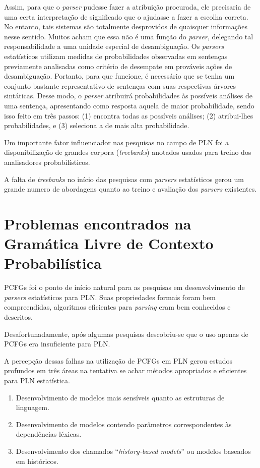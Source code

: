 Assim, para que o \emph{parser} pudesse fazer a atribuição procurada, ele precisaria de uma certa interpretação de significado que o ajudasse a fazer a escolha correta. No entanto, tais sistemas são totalmente desprovidos de quaisquer informações nesse sentido. Muitos acham que essa não é uma função do \emph{parser}, delegando tal responsabilidade a uma unidade especial de desambiguação.
Os \emph{parsers} estatísticos utilizam medidas de probabilidades observadas em sentenças previamente analisadas como critério de desempate em prováveis ações de desambiguação. Portanto, para que funcione, é necessário que se tenha um conjunto bastante representativo de sentenças com suas respectivas árvores sintáticas. Desse modo, o \emph{parser} atribuirá probabilidades às possíveis análises de uma sentença, apresentando como resposta aquela de maior probabilidade, sendo isso feito em três passos: (1) encontra todas as possíveis análises; (2) atribui-lhes probabilidades, e (3) seleciona a de mais alta probabilidade.


Um importante fator influenciador nas pesquisas no campo de PLN foi a disponibilização de grandes corpora (\emph{treebanks}) anotados usados para treino dos analisadores probabilísticos.

A falta de \emph{treebanks} no início das pesquisas com \emph{parsers} estatísticos gerou um grande numero de abordagens quanto ao treino e avaliação dos \emph{parsers} existentes.



\section{Problemas encontrados  na Gramática Livre de Contexto Probabilística}
\label{sec:prob_encontrados}

PCFGs foi o ponto de início natural para as pesquisas em desenvolvimento de \emph{parsers} estatísticos para PLN. Suas propriedades formais foram bem compreendidas, algoritmos eficientes para \emph{parsing} eram bem conhecidos e descritos.

Desafortunadamente, após algumas  pesquisas descobriu-se que o uso apenas de PCFGs  era insuficiente para  PLN.

A percepção dessas falhas na utilização de PCFGs em PLN gerou estudos profundos em três áreas na tentativa se achar métodos apropriados e eficientes para PLN estatística.

\begin{enumerate}
  \item Desenvolvimento de modelos mais sensíveis quanto as estruturas de linguagem.
  \item Desenvolvimento de modelos contendo parâmetros correspondentes às dependências léxicas.
  \item Desenvolvimento dos chamados ``\emph{history-based models}'' ou modelos baseados em históricos.
\end{enumerate}



